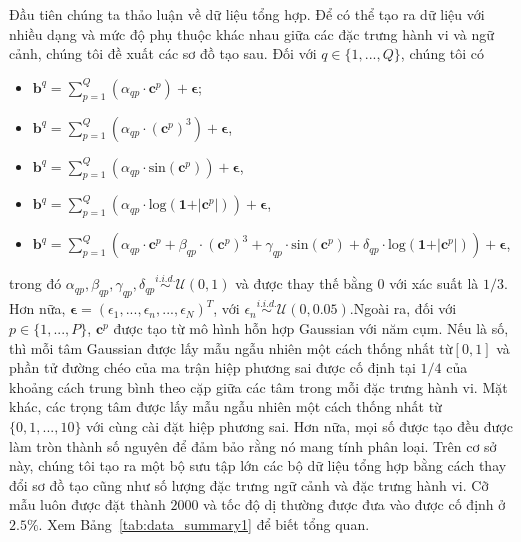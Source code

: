 Đầu tiên chúng ta thảo luận về dữ liệu tổng hợp. Để có thể tạo ra dữ liệu với nhiều dạng và mức độ phụ thuộc khác nhau giữa các đặc trưng hành vi và ngữ cảnh, chúng tôi đề xuất các sơ đồ tạo sau. Đối với $q \in \{1,...,Q\}$, chúng tôi có
\begin{itemize}
    \item[(S1)] $\mathbf{b}^{q} = \sum_{p=1}^{Q}\left(\alpha_{qp}\cdot\mathbf{c}^{p}\right)+\boldsymbol{\epsilon}$;
    \item[(S2)] $\mathbf{b}^{q} = \sum_{p=1}^{Q}\left(\alpha_{qp}\cdot(\mathbf{c}^{p})^{3}\right)+\boldsymbol{\epsilon}$,
    \item[(S3)] $\mathbf{b}^{q} = \sum_{p=1}^{Q}\left(\alpha_{qp}\cdot\mathrm{sin}(\mathbf{c}^{p})\right)+\boldsymbol{\epsilon}$,
    \item[(S4)] $\mathbf{b}^{q} = \sum_{p=1}^{Q}\left(\alpha_{qp}\cdot\mathrm{log}(\mathbf{1}+\vert\mathbf{c}^{p}\vert)\right)+\boldsymbol{\epsilon}$,
    \item[(S5)] $\mathbf{b}^{q} = \sum_{p=1}^{Q}\left(\alpha_{qp}\cdot\mathbf{c}^{p}+\beta_{qp}\cdot(\mathbf{c}^{p})^{3}+\gamma_{qp}\cdot\mathrm{sin}(\mathbf{c}^{p})+\delta_{qp}\cdot\mathrm{log}(\mathbf{1}+\vert\mathbf{c}^{p}\vert)\right)+\boldsymbol{\epsilon}$,
\end{itemize}
trong đó $\alpha_{qp}, \beta_{qp},\gamma_{qp}, \delta_{qp} \stackrel{i.i.d.}{\sim} \mathcal{U}(0,1)$ và được thay thế bằng 0 với xác suất là $1/3$. Hơn nữa, $\boldsymbol{\epsilon} = (\epsilon_{1},...,\epsilon_{n},...,\epsilon_{N})^{T}$, với $\epsilon_{n} \stackrel{i.i.d.}{\sim} \mathcal{U}(0,0.05)$.Ngoài ra, đối với $p \in \{1,...,P\}$, $\mathbf{c}^{p}$ được tạo từ mô hình hỗn hợp Gaussian với năm cụm. Nếu là số, thì mỗi tâm Gaussian được lấy mẫu ngẫu nhiên một cách thống nhất từ ​​$[0,1]$ và phần tử đường chéo của ma trận hiệp phương sai được cố định tại $1/4$ của khoảng cách trung bình theo cặp giữa các tâm trong mỗi đặc trưng hành vi. Mặt khác, các trọng tâm được lấy mẫu ngẫu nhiên một cách thống nhất từ ​​$\{0,1,...,10\}$ với cùng cài đặt hiệp phương sai. Hơn nữa, mọi số được tạo đều được làm tròn thành số nguyên để đảm bảo rằng nó mang tính phân loại. Trên cơ sở này, chúng tôi tạo ra một bộ sưu tập lớn các bộ dữ liệu tổng hợp bằng cách thay đổi sơ đồ tạo cũng như số lượng đặc trưng ngữ cảnh và đặc trưng hành vi. Cỡ mẫu luôn được đặt thành $2000$ và tốc độ dị thường được đưa vào được cố định ở $2.5\%$. Xem Bảng~\ref{tab:data_summary1} để biết tổng quan.

